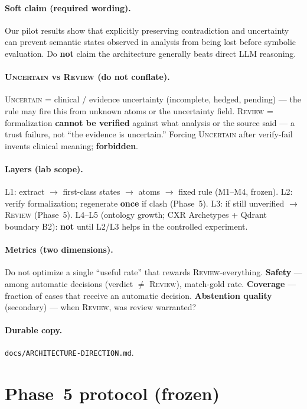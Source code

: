 \documentclass[11pt,a4paper]{article}
\newcommand{\unc}{\textsc{Uncertain}}
\newcommand{\rev}{\textsc{Review}}
\begin{document}
\paragraph{Soft claim (required wording).}
Our pilot results show that explicitly preserving contradiction and uncertainty can prevent semantic states observed in analysis from being lost before symbolic evaluation.
Do \textbf{not} claim the architecture generally beats direct LLM reasoning.

\paragraph{\unc{} vs \rev{} (do not conflate).}
\unc{} = clinical / evidence uncertainty (incomplete, hedged, pending) --- the rule may fire this from unknown atoms or the uncertainty field.
\rev{} = formalization \textbf{cannot be verified} against what analysis or the source said --- a trust failure, not ``the evidence is uncertain.''
Forcing \unc{} after verify-fail invents clinical meaning; \textbf{forbidden}.

\paragraph{Layers (lab scope).}
L1: extract $\rightarrow$ first-class states $\rightarrow$ atoms $\rightarrow$ fixed rule (M1--M4, frozen).
L2: verify formalization; regenerate \textbf{once} if clash (Phase~5).
L3: if still unverified $\rightarrow$ \rev{} (Phase~5).
L4--L5 (ontology growth; CXR Archetypes + Qdrant boundary B2): \textbf{not} until L2/L3 helps in the controlled experiment.

\paragraph{Metrics (two dimensions).}
Do not optimize a single ``useful rate'' that rewards \rev-everything.
\textbf{Safety} --- among automatic decisions (verdict $\neq$ \rev), match-gold rate.
\textbf{Coverage} --- fraction of cases that receive an automatic decision.
\textbf{Abstention quality} (secondary) --- when \rev, was review warranted?

\paragraph{Durable copy.}
\texttt{docs/ARCHITECTURE-DIRECTION.md}.

\section{Phase~5 protocol (frozen)}
\label{sec:phase5-protocol}
\end{document}
